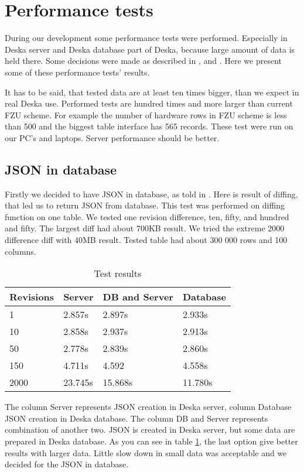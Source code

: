 \documentclass[deska]{subfiles}
\begin{document}
\section{Performance tests}
\label{sec:performance}

During our development some performance tests were performed. Especially in Deska server and Deska database
part of Deska, because large amount of data is held there. Some decisions were made as described in
,  and .
Here we present some of these performance tests' results.

It has to be said, that tested data are at least ten times bigger, than we
expect in real Deska use. Performed tests are hundred times and more larger
than current FZU scheme.
For example the number of hardware rows in FZU scheme is less than 500
and the biggest table interface has 565 records.
These test were run on our PC's and laptops. Server performance should be better.

\subsection{JSON in database}
\label{sec:test-json}
Firstly we decided to have JSON in database, as told in .
Here is result of diffing, that led us to
return JSON from database.
This test was performed on diffing function on one table.
We tested one revision difference, ten, fifty, and hundred and fifty.
The largest diff had about 700KB result.
We tried the extreme 2000 difference diff with 40MB result.
Tested table had about 300 000 rows and 100 columns.

\begin{longtable}{ l | l | l | l}
\caption{Test results} \\
Revisions & Server & DB and Server & Database \\
\hline
\endhead
\label{test:json}
1 & 2.857s & 2.897s & 2.933s \\
10 & 2.858s & 2.937s & 2.913s \\
50 & 2.778s & 2.839s & 2.860s \\
150 & 4.711s & 4.592 & 4.558s \\
2000 & 23.745s & 15.868s & 11.780s \\
\end{longtable}

The column Server represents JSON creation in Deska server, column Database JSON creation in
Deska database. The column DB and Server represents combination of another two. JSON is created
in Deska server, but some data are prepared in Deska database.
As you can see in table \ref{test:json}, the last option give better results with larger data.
Little slow down in small data was acceptable and we decided for the JSON in database.
\end{document}
